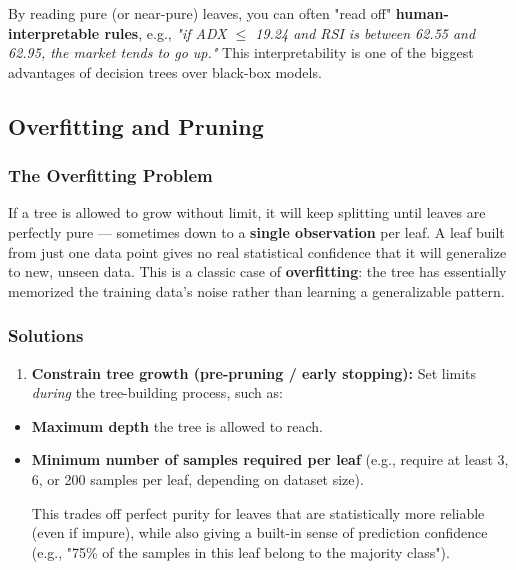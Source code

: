 \documentclass[12pt,openany]{book}
\begin{document}
By reading pure (or near-pure) leaves, you can often "read off" \textbf{human-interpretable rules}, e.g., \textit{"if ADX \(\leq\) 19.24 and RSI is between 62.55 and 62.95, the market tends to go up."} This interpretability is one of the biggest advantages of decision trees over black-box models.

\medskip


\subsection{Overfitting and Pruning}


\subsubsection{The Overfitting Problem}

If a tree is allowed to grow without limit, it will keep splitting until leaves are perfectly pure --- sometimes down to a \textbf{single observation} per leaf. A leaf built from just one data point gives no real statistical confidence that it will generalize to new, unseen data. This is a classic case of \textbf{overfitting}: the tree has essentially memorized the training data's noise rather than learning a generalizable pattern.

\subsubsection{Solutions}

\begin{enumerate}[leftmargin=*]
    \item \textbf{Constrain tree growth (pre-pruning / early stopping):} Set limits \textit{during} the tree-building process, such as:
\end{enumerate}

\begin{itemize}[leftmargin=*]
    \item \textbf{Maximum depth} the tree is allowed to reach.
    \item \textbf{Minimum number of samples required per leaf} (e.g., require at least 3, 6, or 200 samples per leaf, depending on dataset size).

This trades off perfect purity for leaves that are statistically more reliable (even if impure), while also giving a built-in sense of prediction confidence (e.g., "75\% of the samples in this leaf belong to the majority class").

\end{itemize}
\end{document}
